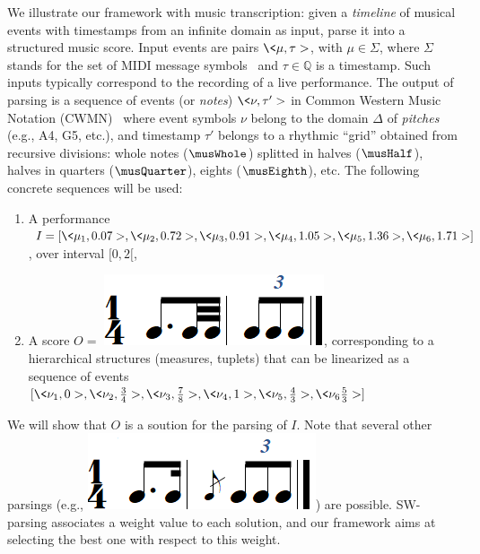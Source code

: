 


\begin{example}\label{ex:running}
We
illustrate our framework with music transcription: given
a \emph{timeline} of musical events with timestamps from an infinite
domain as input, parse it
into a structured music score. Input events
are pairs $\< \mu, \tau>$, with $\mu \in \Sigma$, where $\Sigma$ stands for the
set of MIDI message symbols~\cite{?}
and  $\tau \in \mathbb{Q}$ is a timestamp. Such inputs typically correspond
to the recording of a live performance. The output of parsing
is a sequence of events (or \emph{notes}) $\< \nu, \tau'>$   in
Common Western Music Notation (CWMN)~\cite{Gould11Notation}
where event symbols $\nu$ belong to the domain $\Delta$
of \emph{pitches} (e.g., A4, G5, etc.), and timestamp $\tau'$
belongs to a rhythmic ``grid'' obtained from recursive divisions:
whole notes ($\musWhole$) splitted in halves ($\musHalf$), halves
in quarters ($\musQuarter$), eights ($\musEighth$), etc.
The following concrete sequences
will be used:
\begin{enumerate}
  \item A performance  $I = [ \<\mu_1, 0.07>, \<\mu_2, 0.72>, \<\mu_3, 0.91>, \<\mu_4, 1.05>, \<\mu_5, 1.36>, \<\mu_6, 1.71>]$,
     over interval $[0,2[$,
  \item A score $O =$ \includegraphics[scale=0.20]{pictures/score5.png}, corresponding to
      a hierarchical structures (measures, tuplets) that can be linearized as a sequence of events
      $[\<\nu_1,0>, \<\nu_2,\frac{3}{4}>, \<\nu_3,\frac{7}{8}>, \<\nu_4,1>, \<\nu_5,\frac{4}{3}>, \<\nu_6\frac{5}{3}>]$
\end{enumerate}
\smallskip

We will show that $O$ is a soution for the
parsing of $I$. Note that several other parsings (e.g.,
\includegraphics[scale=0.20]{pictures/score4.png}) are possible.
SW-parsing associates a weight value
to each solution, and our framework
aims at selecting the best one with respect to this weight.
\endex
\end{example}


